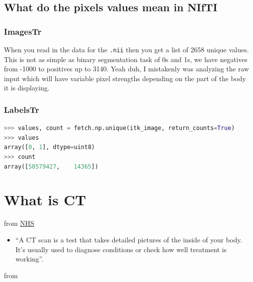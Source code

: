 \documentclass[11pt]{article}
\begin{document}
\subsection{What do the pixels values mean in NIfTI}

\subsubsection{ImagesTr}

When you read in the data for the \texttt{.nii} then you get a list of 2658 unique values. This is not as simple as binary segmentation task of 0s and 1s, we have negatives from -1000 to positives up to 3140. Yeah duh, I mistakenly was analyzing the raw input which will have variable pixel strengths depending on the part of the body it is displaying.

\subsubsection{LabelsTr}

\begin{lstlisting}[language=python]
>>> values, count = fetch.np.unique(itk_image, return_counts=True)
>>> values
array([0, 1], dtype=uint8)
>>> count
array([50579427,    14365])
\end{lstlisting}

\section{What is CT}

from \href{https://www.nhs.uk/conditions/ct-scan/}{NHS}

\begin{itemize}
    \item ``A CT scan is a test that takes detailed pictures of the inside of your body. It's usually used to diagnose conditions or check how well treatment is working''.
\end{itemize}

from~\cite{ct-scan}
\end{document}
